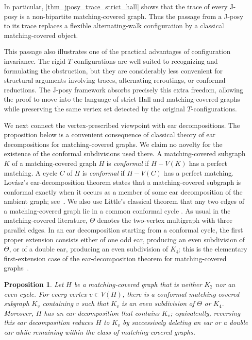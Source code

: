 \documentclass[preprint,12pt]{elsarticle}
\theoremstyle{plain}
\newtheorem{proposition}[theorem]{Proposition}
\begin{document}
In particular, \cref{thm_jposy_trace_strict_hall} shows that the trace of every J-posy
is a non-bipartite matching-covered graph.  Thus the passage from a J-posy to
its trace replaces a flexible alternating-walk configuration by a classical
matching-covered object.

This passage also illustrates one of the practical advantages of configuration
invariance. The rigid \(T\)-configurations are well suited to recognizing and
formulating the obstruction, but they are considerably less convenient for
structural arguments involving traces, alternating reroutings, or conformal
reductions. The J-posy framework absorbs precisely this extra freedom, allowing
the proof to move into the language of strict Hall and matching-covered graphs
while preserving the same vertex set detected by the original
\(T\)-configurations.

We next connect the vertex-prescribed viewpoint with ear decompositions.  The proposition below is a convenient consequence of classical theory of ear decompositions for matching-covered graphs.  We claim no novelty for the existence of the conformal subdivisions used there.  A
matching-covered subgraph \(K\) of a matching-covered graph \(H\) is
\emph{conformal} if \(H-V(K)\) has a perfect matching.  A cycle \(C\) of
\(H\) is \emph{conformal} if \(H-V(C)\) has a perfect matching.  Lov\'asz's
ear-decomposition theorem states that a matching-covered subgraph is conformal
exactly when it occurs as a member of some ear decomposition of the ambient
graph; see~\cite{lovasz1983ear}.  We also use Little's classical theorem that
any two edges of a matching-covered graph lie in a common conformal cycle
\cite{little1974factorcovered}.  As usual in the matching-covered literature,
\(\Theta\) denotes the two-vertex multigraph with three parallel edges.  In an
ear decomposition starting from a conformal cycle, the first proper extension
consists either of one odd ear, producing an even subdivision of \(\Theta\),
or of a double ear, producing an even subdivision of \(K_4\); this is the
elementary first-extension case of the ear-decomposition theorem for
matching-covered graphs~\cite{lovasz1983ear}.

\begin{proposition}\label{prop_vertex_prescribed_ear_reduction}
Let \(H\) be a matching-covered graph that is neither \(K_2\) nor an even
cycle.  For every vertex \(v\in V(H)\), there is a conformal matching-covered
subgraph \(K_v\) containing \(v\) such that \(K_v\) is an even subdivision
of \(\Theta\) or \(K_4\).  Moreover, \(H\) has an ear decomposition that
contains \(K_v\); equivalently, reversing this ear decomposition reduces
\(H\) to \(K_v\) by successively deleting an ear or a double ear while
remaining within the class of matching-covered graphs.
\end{proposition}
\end{document}

